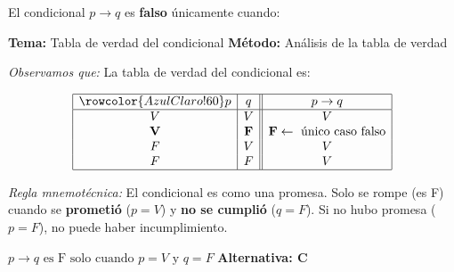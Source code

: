 \vspace{0.5cm}

\begin{tcolorbox}[
  enhanced, breakable,
  colback=GrisClaro, colframe=AzulPizarra,
  fonttitle=\bfseries\sffamily,
  title={Ejercicio 3 — Condicional falso},
  arc=3pt, boxrule=0.8pt
]

\begin{problema}
El condicional $p \rightarrow q$ es \textbf{falso} únicamente cuando:
\end{problema}

\smallskip
\noindent
\textbf{\sffamily\color{AzulMedio}Tema:} Tabla de verdad del condicional \hfill
\textbf{\sffamily\color{AzulMedio}Método:} Análisis de la tabla de verdad

\medskip
\noindent\textit{Observamos que:} La tabla de verdad del condicional es:

\[
\begin{array}{|c|c||c|}
\hline
\rowcolor{AzulClaro!60}
p & q & p \rightarrow q \\
\hline
V & V & V \\
\mathbf{V} & \mathbf{F} & \mathbf{F} \leftarrow \text{ único caso falso} \\
F & V & V \\
F & F & V \\
\hline
\end{array}
\]

\noindent\textit{Regla mnemotécnica:} El condicional es como una promesa. Solo se rompe (es F) cuando se \textbf{prometió} ($p = V$) y \textbf{no se cumplió} ($q = F$). Si no hubo promesa ($p = F$), no puede haber incumplimiento.

\begin{tcolorbox}[colback=AzulClaro!60, colframe=AzulPizarra, arc=2pt, boxrule=0.8pt, left=8pt, right=8pt]
\centering
$\displaystyle \boxed{p \rightarrow q \text{ es F solo cuando } p = V \text{ y } q = F}$ \quad \textbf{Alternativa: C}
\end{tcolorbox}
\end{tcolorbox}

\vspace{0.5cm}

